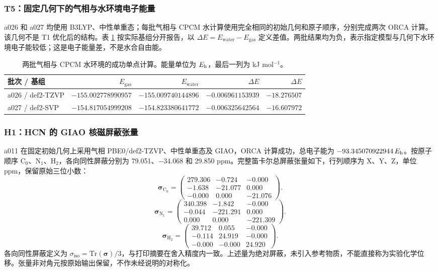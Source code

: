 \subsubsection{T5：固定几何下的气相与水环境电子能量}
a026 和 a027 均使用 B3LYP、中性单重态；每批气相与 CPCM 水计算使用完全相同的初始几何和原子顺序，分别完成两次 ORCA 计算。该几何不是 T1 优化后的结构。表 \ref{tab:t5-environments} 按实际基组分开报告，以 $\Delta E=E_{\mathrm{water}}-E_{\mathrm{gas}}$ 定义差值。两批结果均为负，表示指定模型与几何下水环境电子能较低；这是电子能量差，不是水合自由能。

\begin{table}[htbp]
\centering\small
\caption{两批气相与 CPCM 水环境的成功单点计算。能量单位为 $E_{\mathrm h}$，最后一列为 kJ mol$^{-1}$。}
\label{tab:t5-environments}
\begin{tabular}{lrrrr}
\toprule
批次 / 基组 & $E_{\mathrm{gas}}$ & $E_{\mathrm{water}}$ & $\Delta E$ & $\Delta E$\\
\midrule
a026 / def2-TZVP & $-155.002778990957$ & $-155.009740144896$ & $-0.006961153939$ & $-18.276507$\\
a027 / def2-SVP & $-154.817054999208$ & $-154.823380641772$ & $-0.006325642564$ & $-16.607972$\\
\bottomrule
\end{tabular}
\end{table}

\subsubsection{H1：HCN 的 GIAO 核磁屏蔽张量}
a011 在固定初始几何上采用气相 PBE0/def2-TZVP、中性单重态及 GIAO，ORCA 计算成功，总电子能为 $-93.345070922944\,E_{\mathrm h}$。按原子顺序 C$_0$、N$_1$、H$_2$，各向同性屏蔽分别为 79.051、$-34.068$ 和 29.850 ppm。完整笛卡尔总屏蔽张量如下，行列顺序为 X、Y、Z，单位 ppm，保留原始三位小数：
\begin{equation}
\bm{\sigma}_{\mathrm{C}_0}=\begin{pmatrix}
279.306 & -0.724 & -0.000 \\
-1.638 & -21.077 & 0.000 \\
-0.000 & 0.000 & -21.076
\end{pmatrix}.
\end{equation}
\begin{equation}
\bm{\sigma}_{\mathrm{N}_1}=\begin{pmatrix}
340.398 & -1.842 & -0.000 \\
-0.044 & -221.291 & 0.000 \\
0.000 & 0.000 & -221.309
\end{pmatrix}.
\end{equation}
\begin{equation}
\bm{\sigma}_{\mathrm{H}_2}=\begin{pmatrix}
39.712 & 0.055 & -0.000 \\
-0.114 & 24.919 & -0.000 \\
-0.000 & -0.000 & 24.920
\end{pmatrix}.
\end{equation}
各向同性屏蔽定义为 $\sigma_{\mathrm{iso}}=\mathrm{Tr}(\bm\sigma)/3$，与打印摘要在舍入精度内一致。上述量为绝对屏蔽，未引入参考物质，不能直接称为实验化学位移。张量非对角元按原始输出保留，不作未经说明的对称化。

